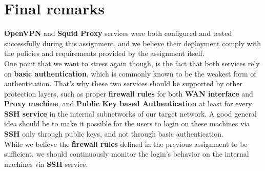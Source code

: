 \section{Final remarks}
\textbf{OpenVPN} and \textbf{Squid Proxy} services were both configured and tested successfully during this assignment, and we believe their deployment comply with the policies and requirements provided by the assignment itself.\\
One point that we want to stress again though, is the fact that both services rely on \textbf{basic authentication}, which is commonly known to be the weakest form of authentication. That's why these two services should be supported by other protection layers, such as proper \textbf{firewall rules} for both \textbf{WAN interface} and \textbf{Proxy machine}, and \textbf{Public Key based Authentication} at least for every \textbf{SSH service} in the internal subnetworks of our target network. A good general idea should be to make it possible for the users to login on these machines via \textbf{SSH} only through public keys, and not through basic authentication.\\
While we believe the \textbf{firewall rules} defined in the previous assignment to be sufficient, we should continuously monitor the login's behavior on the internal machines via \textbf{SSH} service.
